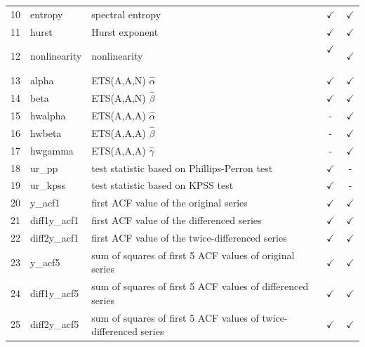 \documentclass[11pt,a4paper,]{article}
\def\yes{$\checkmark$}
\theoremstyle{definition}
\theoremstyle{definition}
\theoremstyle{definition}
\theoremstyle{remark}
\begin{document}
\begin{table}[!htp]
\begin{tabular}{llp{}cc}
10 & entropy        & spectral entropy                                                                        & \yes  & \yes \\
11 & hurst          & Hurst exponent                                                                          & \yes  & \yes \\
12 & nonlinearity   & nonlinearity                                                                            & \yes\ & \yes \\
13 & alpha          & ETS(A,A,N) $\hat\alpha$                                                                 & \yes  & \yes \\
14 & beta           & ETS(A,A,N) $\hat\beta$                                                                  & \yes  & \yes\\
15 & hwalpha        & ETS(A,A,A) $\hat\alpha$                                                                 & -     & \yes \\
16 & hwbeta         & ETS(A,A,A) $\hat\beta$                                                                  & -     & \yes \\
17 & hwgamma        & ETS(A,A,A) $\hat\gamma$                                                                 & -     & \yes \\
18 & ur\_pp         & test statistic based on Phillips-Perron test                                            & \yes  & - \\
19 & ur\_kpss       & test statistic based on KPSS test                                                       & \yes  & - \\
20 & y\_acf1        & first ACF value of the original series                                                  & \yes  & \yes \\
21 & diff1y\_acf1   & first ACF value of the differenced series                                               & \yes  & \yes \\
22 & diff2y\_acf1   & first ACF value of the twice-differenced series                                         & \yes  & \yes \\
23 & y\_acf5        & sum of squares of first 5 ACF values of original series                                 & \yes  & \yes \\
24 & diff1y\_acf5   & sum of squares of first 5 ACF values of differenced series                              & \yes  & \yes \\
25 & diff2y\_acf5   & sum of squares of first 5 ACF values of twice-differenced series                        & \yes  & \yes \\

\end{tabular}
\end{table}
\end{document}
